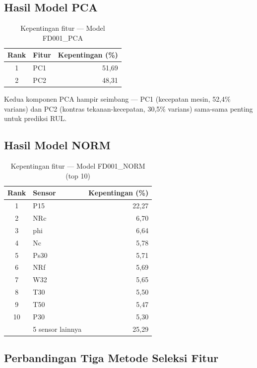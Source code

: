 \documentclass[11pt,a4paper]{article}
\begin{document}
\subsection{Hasil Model PCA}

\begin{table}[H]
\centering\small
\caption{Kepentingan fitur --- Model FD001\_PCA}
\label{tab:garson_pca}
\begin{tabular}{clr}
\toprule
Rank & Fitur & Kepentingan (\%) \\
\midrule
1 & PC1 & 51,69 \\
2 & PC2 & 48,31 \\
\bottomrule
\end{tabular}
\end{table}

Kedua komponen PCA hampir seimbang --- PC1 (kecepatan mesin, 52,4\% varians)
dan PC2 (kontras tekanan-kecepatan, 30,5\% varians) sama-sama penting untuk
prediksi RUL.

\subsection{Hasil Model NORM}

\begin{table}[H]
\centering\small
\caption{Kepentingan fitur --- Model FD001\_NORM (top 10)}
\label{tab:garson_norm}
\begin{tabular}{clr}
\toprule
Rank & Sensor & Kepentingan (\%) \\
\midrule
1  & P15     & 22,27 \\
2  & NRc     &  6,70 \\
3  & phi     &  6,64 \\
4  & Nc      &  5,78 \\
5  & Ps30    &  5,71 \\
6  & NRf     &  5,69 \\
7  & W32     &  5,65 \\
8  & T30     &  5,50 \\
9  & T50     &  5,47 \\
10 & P30     &  5,30 \\
\midrule
   & 5 sensor lainnya & 25,29 \\
\bottomrule
\end{tabular}
\end{table}

\subsection{Perbandingan Tiga Metode Seleksi Fitur}
\end{document}
